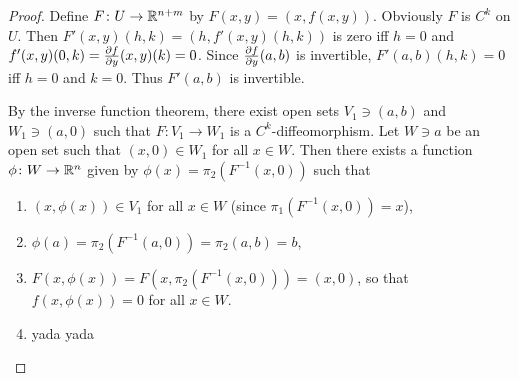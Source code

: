 \begin{proof}
    Define $F\colon U \to \mathbb{R}^{n+m}$ by $F(x, y) = (x, f(x, y))$.
    Obviously $F$ is $C^k$ on $U$.
    Then $F'(x, y)(h, k) = (h, f'(x, y)(h, k))$ is zero iff $h = 0$ and
    $f'(x, y)(0, k) = \pdv fy(x, y)(k) = 0$.
    Since $\pdv fy(a, b)$ is invertible, $F'(a, b)(h, k) = 0$ iff $h = 0$
    and $k = 0$.
    Thus $F'(a, b)$ is invertible.

    By the inverse function theorem, there exist open sets
    $V_1 \ni (a, b)$ and $W_1 \ni (a, 0)$ such that $F\colon V_1 \to W_1$
    is a $C^k$-diffeomorphism.
    Let $W \ni a$ be an open set such that $(x, 0) \in W_1$
    for all $x \in W$.
    Then there exists a function $\phi\colon W \to \mathbb{R}^n$ given by
    $\phi(x) = \pi_2(F^{-1}(x, 0))$ such that
    \begin{enumerate}
        \item $(x, \phi(x)) \in V_1$ for all $x \in W$
            (since $\pi_1(F^{-1}(x, 0)) = x$),
        \item $\phi(a) = \pi_2(F^{-1}(a, 0)) = \pi_2(a, b) = b$,
        \item $F(x, \phi(x)) = F(x, \pi_2(F^{-1}(x, 0))) = (x, 0)$, so that
            $f(x, \phi(x)) = 0$ for all $x \in W$.
        \item yada yada \qedhere
    \end{enumerate}
\end{proof}
